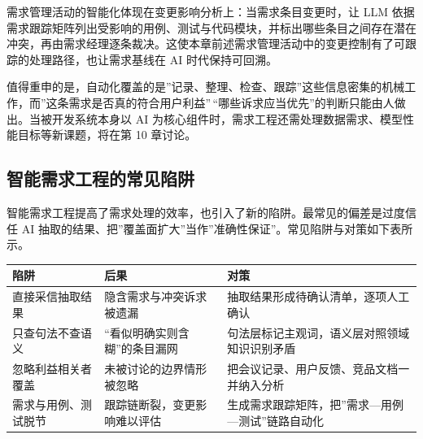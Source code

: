 \documentclass[12pt,a4paper,twoside,openany]{ctexbook}
\numberwithin{figure}{chapter}
\numberwithin{table}{chapter}
\newcounter{none}
\begin{document}
需求管理活动的智能化体现在变更影响分析上：当需求条目变更时，让 LLM
依据需求跟踪矩阵列出受影响的用例、测试与代码模块，并标出哪些条目之间存在潜在冲突，再由需求经理逐条裁决。这使本章前述需求管理活动中的变更控制有了可跟踪的处理路径，也让需求基线在
AI 时代保持可回溯。

值得重申的是，自动化覆盖的是''记录、整理、检查、跟踪''这些信息密集的机械工作，而''这条需求是否真的符合用户利益''\,``哪些诉求应当优先''的判断只能由人做出。当被开发系统本身以
AI 为核心组件时，需求工程还需处理数据需求、模型性能目标等新课题，将在第
10 章讨论。

\subsection{智能需求工程的常见陷阱}\label{ux667aux80fdux9700ux6c42ux5de5ux7a0bux7684ux5e38ux89c1ux9677ux9631}

智能需求工程提高了需求处理的效率，也引入了新的陷阱。最常见的偏差是过度信任
AI
抽取的结果、把''覆盖面扩大''当作''准确性保证''。常见陷阱与对策如下表所示。

{\def\LTcaptype{none} %
\begin{longtable}[]{@{}
  >{\raggedright\arraybackslash}p{}
  >{\raggedright\arraybackslash}p{}
  >{\raggedright\arraybackslash}p{}@{}}
\toprule\noalign{}
\begin{minipage}[b]{\linewidth}\raggedright
陷阱
\end{minipage} & \begin{minipage}[b]{\linewidth}\raggedright
后果
\end{minipage} & \begin{minipage}[b]{\linewidth}\raggedright
对策
\end{minipage} \\
\midrule\noalign{}
\endhead
\bottomrule\noalign{}
\endlastfoot
直接采信抽取结果 & 隐含需求与冲突诉求被遗漏 &
抽取结果形成待确认清单，逐项人工确认 \\
只查句法不查语义 & ``看似明确实则含糊''的条目漏网 &
句法层标记主观词，语义层对照领域知识识别矛盾 \\
忽略利益相关者覆盖 & 未被讨论的边界情形被忽略 &
把会议记录、用户反馈、竞品文档一并纳入分析 \\
需求与用例、测试脱节 & 跟踪链断裂，变更影响难以评估 &
生成需求跟踪矩阵，把''需求---用例---测试''链路自动化 \\
\end{longtable}
}
\end{document}
